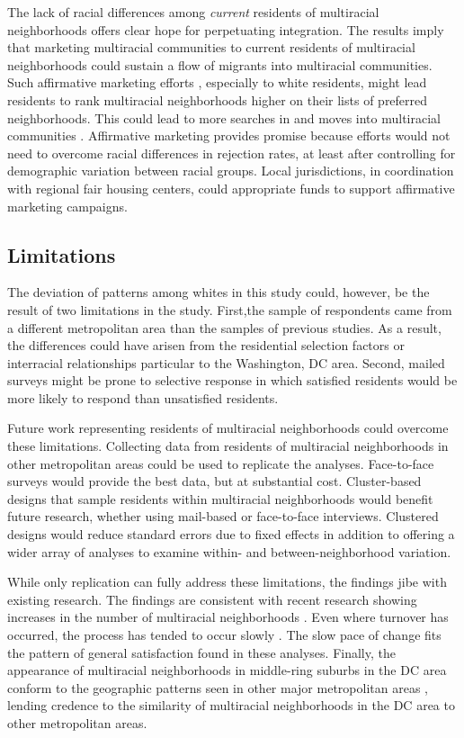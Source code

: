 \documentclass{baderart}
\begin{document}
The lack of racial differences among \emph{current} residents of multiracial neighborhoods offers clear hope for perpetuating integration. The results imply that marketing multiracial communities to current residents of multiracial neighborhoods could sustain a flow of migrants into multiracial communities. Such affirmative marketing efforts \citep{haberle_accessing_2012}, especially to white residents, might lead residents to rank multiracial neighborhoods higher on their lists of preferred neighborhoods. This could lead to more searches in and moves into multiracial communities \citep{krysan_cycle_2017}. Affirmative marketing provides promise because efforts would not need to overcome racial differences in rejection rates, at least after controlling for demographic variation between racial groups. Local jurisdictions, in coordination with regional fair housing centers, could appropriate funds to support affirmative marketing campaigns. 

\subsection{Limitations}
The deviation of patterns among whites in this study could, however, be the result of two limitations in the study. First,the sample of respondents came from a different metropolitan area than the samples of previous studies. As a result, the differences could have arisen from the residential selection factors or interracial relationships particular to the Washington, DC area. Second, mailed surveys might be prone to selective response in which satisfied residents would be more likely to respond than unsatisfied residents. 

Future work representing residents of multiracial neighborhoods could overcome these limitations. Collecting data from residents of multiracial neighborhoods in other metropolitan areas could be used to replicate the analyses. Face-to-face surveys would provide the best data, but at substantial cost. Cluster-based designs that sample residents within multiracial neighborhoods would benefit future research, whether using mail-based or face-to-face interviews. Clustered designs would reduce standard errors due to fixed effects in addition to offering a wider array of analyses to examine within- and between-neighborhood variation.

While only replication can fully address these limitations, the findings jibe with existing research. The findings are consistent with recent research showing increases in the number of multiracial neighborhoods \citep{friedman_do_2007, logan_global_2010, bader_fragmented_2016}. Even where turnover has occurred, the process has tended to occur slowly \citep{ellen_sharing_2000}. The slow pace of change fits the pattern of general satisfaction found in these analyses. Finally, the appearance of multiracial neighborhoods in middle-ring suburbs in the DC area conform to the geographic patterns seen in other major metropolitan areas \citep[e.g., ][]{bader_fragmented_2016}, lending credence to the similarity of multiracial neighborhoods in the DC area to other metropolitan areas. 
\end{document}
